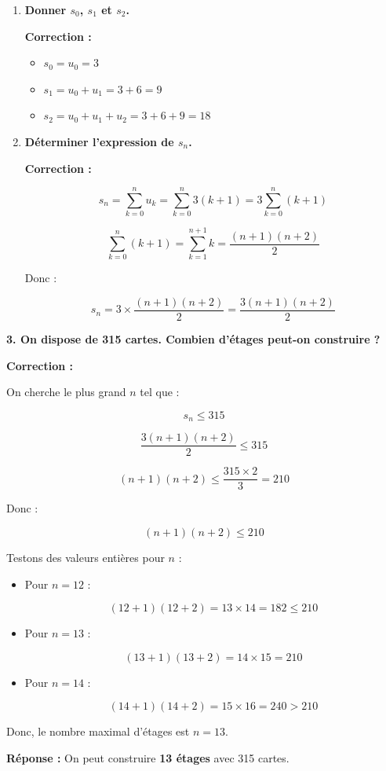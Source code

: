 \documentclass{article}
\begin{document}
\begin{enumerate}[label=\alph*)]

\item \textbf{Donner \( s_0 \), \( s_1 \) et \( s_2 \).}

\textbf{Correction :}

\begin{itemize}
    \item \( s_0 = u_0 = 3 \)
    \item \( s_1 = u_0 + u_1 = 3 + 6 = 9 \)
    \item \( s_2 = u_0 + u_1 + u_2 = 3 + 6 + 9 = 18 \)
\end{itemize}

\bigskip

\item \textbf{Déterminer l'expression de \( s_n \).}

\textbf{Correction :}

\[ s_n = \sum_{k=0}^{n} u_k = \sum_{k=0}^{n} 3(k + 1) = 3 \sum_{k=0}^{n} (k + 1) \]

\[ \sum_{k=0}^{n} (k + 1) = \sum_{k=1}^{n+1} k = \dfrac{(n + 1)(n + 2)}{2} \]

Donc :

\[ s_n = 3 \times \dfrac{(n + 1)(n + 2)}{2} = \dfrac{3(n + 1)(n + 2)}{2} \]

\end{enumerate}

\bigskip

\textbf{3. On dispose de 315 cartes. Combien d'étages peut-on construire ?}

\textbf{Correction :}

On cherche le plus grand \( n \) tel que :

\[ s_n \leq 315 \]

\[ \dfrac{3(n + 1)(n + 2)}{2} \leq 315 \]

\[ (n + 1)(n + 2) \leq \dfrac{315 \times 2}{3} = 210 \]

Donc :

\[ (n + 1)(n + 2) \leq 210 \]

Testons des valeurs entières pour \( n \) :

\begin{itemize}
    \item Pour \( n = 12 \) :

    \[ (12 + 1)(12 + 2) = 13 \times 14 = 182 \leq 210 \]

    \item Pour \( n = 13 \) :

    \[ (13 + 1)(13 + 2) = 14 \times 15 = 210 \]

    \item Pour \( n = 14 \) :

    \[ (14 + 1)(14 + 2) = 15 \times 16 = 240 > 210 \]
\end{itemize}

Donc, le nombre maximal d'étages est \( n = 13 \).

\textbf{Réponse :} On peut construire \textbf{13 étages} avec 315 cartes.
\end{document}
